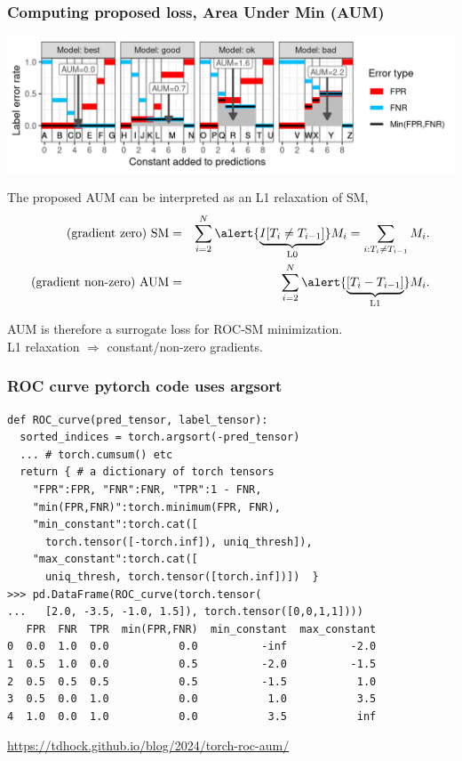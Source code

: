 \documentclass[t]{beamer}
\begin{document}
\begin{frame}
  \frametitle{Computing proposed loss, Area Under Min (AUM)}
  \includegraphics[width=\textwidth]{figure-more-than-one-new-binary-aum-rate}

The proposed AUM can be interpreted as an L1 relaxation of SM,
\vskip -0.5cm
\begin{eqnarray*}
  \text{(gradient zero) } \text{SM} &=&
    \sum_{i=2}^{N}
    \alert{\underbrace{I[ T_{i} \neq T_{i-1} ]}_{\text{L0}}}
    M_i =
    \sum_{i:T_{i} \neq T_{i-1} }
                  M_i.
                                    \\
  \text{(gradient non-zero) } \text{AUM} &=&
    \sum_{i=2}^{N}
    \alert{\underbrace{[ T_{i} - T_{i-1} ]}_{\text{L1}}}
                   M_i.\\
\end{eqnarray*}
\vskip -0.5cm

AUM is therefore a surrogate loss for ROC-SM minimization.\\
L1 relaxation $\Rightarrow$ constant/non-zero gradients.
\end{frame}

\begin{frame}[fragile]
  \frametitle{ROC curve pytorch code uses argsort}
\small
  \begin{verbatim}
def ROC_curve(pred_tensor, label_tensor):
  sorted_indices = torch.argsort(-pred_tensor)
  ... # torch.cumsum() etc
  return { # a dictionary of torch tensors
    "FPR":FPR, "FNR":FNR, "TPR":1 - FNR,
    "min(FPR,FNR)":torch.minimum(FPR, FNR),
    "min_constant":torch.cat([
      torch.tensor([-torch.inf]), uniq_thresh]),
    "max_constant":torch.cat([
      uniq_thresh, torch.tensor([torch.inf])])  }
>>> pd.DataFrame(ROC_curve(torch.tensor(
...   [2.0, -3.5, -1.0, 1.5]), torch.tensor([0,0,1,1])))
   FPR  FNR  TPR  min(FPR,FNR)  min_constant  max_constant
0  0.0  1.0  0.0           0.0          -inf          -2.0
1  0.5  1.0  0.0           0.5          -2.0          -1.5
2  0.5  0.5  0.5           0.5          -1.5           1.0
3  0.5  0.0  1.0           0.0           1.0           3.5
4  1.0  0.0  1.0           0.0           3.5           inf
\end{verbatim}

    \url{https://tdhock.github.io/blog/2024/torch-roc-aum/}

\end{frame}
\end{document}
